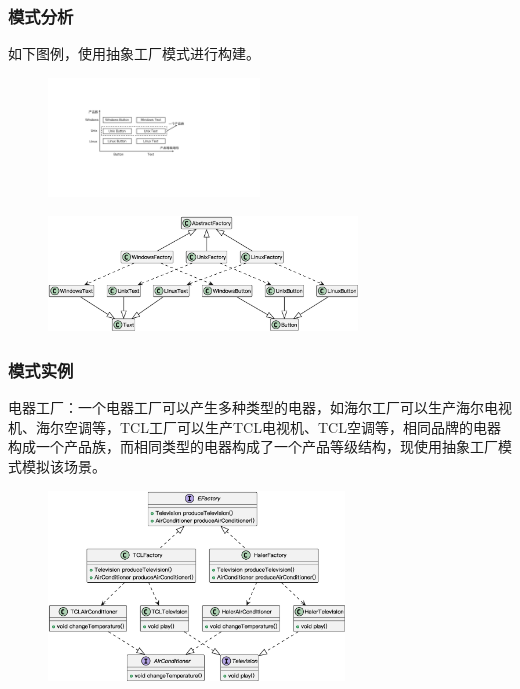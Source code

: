 \subsubsection{模式分析}
如下图例，使用抽象工厂模式进行构建。
\begin{figure}[H]
    \vspace{-0.5em}
	\centering
	\includegraphics[width=0.5\textwidth]{images/抽象工厂模式分析.pdf}
    \vspace{-1em}
\end{figure}

\begin{figure}[H]
    \vspace{-0.5em}
	\centering
	\includegraphics[width=0.73\textwidth]{images/抽象工厂模式分析.eps}
    \vspace{-1em}
\end{figure}

\subsubsection{模式实例}
电器工厂：一个电器工厂可以产生多种类型的电器，如海尔工厂可以生产海尔电视机、海尔空调等，TCL工厂可以生产TCL电视机、TCL空调等，相同品牌的电器构成一个产品族，而相同类型的电器构成了一个产品等级结构，现使用抽象工厂模式模拟该场景。
\begin{figure}[H]
    \vspace{-0.5em}
	\centering
	\includegraphics[width=0.7\textwidth]{images/抽象工厂模式实例1.eps}
    \vspace{-1em}
\end{figure}

